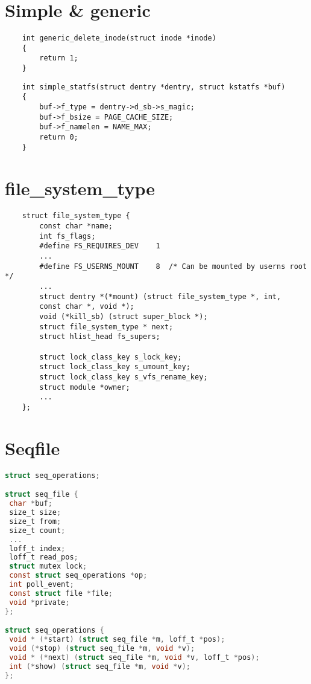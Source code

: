 \section*{Simple \& generic}

\begin{lstlisting}
	int generic_delete_inode(struct inode *inode)
	{
		return 1;
	}
\end{lstlisting}

\begin{lstlisting}
	int simple_statfs(struct dentry *dentry, struct kstatfs *buf)
	{
		buf->f_type = dentry->d_sb->s_magic;
		buf->f_bsize = PAGE_CACHE_SIZE;
		buf->f_namelen = NAME_MAX;
		return 0;
	}
\end{lstlisting}

\section*{file\_system\_type}

\begin{lstlisting}
	struct file_system_type {
		const char *name;
		int fs_flags;
		#define FS_REQUIRES_DEV    1 
		...
		#define FS_USERNS_MOUNT    8  /* Can be mounted by userns root */
		...
		struct dentry *(*mount) (struct file_system_type *, int,
		const char *, void *);
		void (*kill_sb) (struct super_block *);
		struct file_system_type * next;
		struct hlist_head fs_supers;
		
		struct lock_class_key s_lock_key;
		struct lock_class_key s_umount_key;
		struct lock_class_key s_vfs_rename_key;
		struct module *owner;
		...
	};
\end{lstlisting}

\section*{Seqfile}
\begin{lstlisting}[language=C, label=lst:1, caption= Структуры]
struct seq_operations;

struct seq_file {
 char *buf;
 size_t size;
 size_t from;
 size_t count;
 ...
 loff_t index;
 loff_t read_pos;
 struct mutex lock;
 const struct seq_operations *op;
 int poll_event;
 const struct file *file;
 void *private;
};

struct seq_operations {
 void * (*start) (struct seq_file *m, loff_t *pos);
 void (*stop) (struct seq_file *m, void *v);
 void * (*next) (struct seq_file *m, void *v, loff_t *pos);
 int (*show) (struct seq_file *m, void *v);
};
\end{lstlisting}
